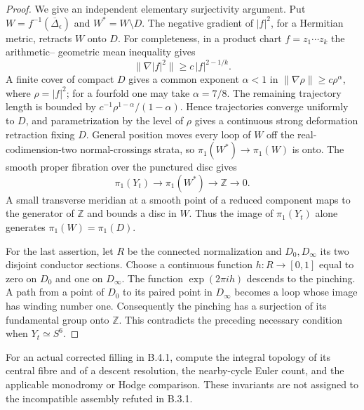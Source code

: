 \begin{proof}
We give an independent elementary
surjectivity argument. Put
$W=f^{-1}(\overline\Delta_\epsilon)$
and $W^*=W\setminus D$. The negative
gradient of $|f|^2$, for a Hermitian
metric, retracts $W$ onto $D$.
For completeness, in a product chart
$f=z_1\cdots z_k$ the arithmetic--
geometric mean inequality gives
\[
 \|\nabla |f|^2\|
   \ge c\,|f|^{2-1/k}.
\]
A finite cover of compact $D$ gives
a common exponent $\alpha<1$ in
$\|\nabla\rho\|\ge c\rho^\alpha$,
where $\rho=|f|^2$; for a fourfold
one may take $\alpha=7/8$.
The remaining trajectory length is
bounded by
$c^{-1}\rho^{1-\alpha}/(1-\alpha)$.
Hence trajectories converge uniformly
to $D$, and parametrization by the
level of $\rho$ gives a continuous
strong deformation retraction fixing
$D$. General position moves every
loop of $W$ off the real-codimension-two
normal-crossings strata, so
$\pi_1(W^*)\to\pi_1(W)$ is onto.
The smooth proper fibration over the
punctured disc gives
\[
 \pi_1(Y_t)\longrightarrow\pi_1(W^*)
       \longrightarrow\mathbb Z\longrightarrow0.
\]
A small transverse meridian at a
smooth point of a reduced component
maps to the generator of $\mathbb Z$
and bounds a disc in $W$.
Thus the image of $\pi_1(Y_t)$ alone
generates $\pi_1(W)=\pi_1(D)$.

For the last assertion, let $R$ be
the connected normalization and
$D_0,D_\infty$ its two disjoint
conductor sections. Choose a
continuous function $h:R\to[0,1]$
equal to zero on $D_0$ and one on
$D_\infty$. The function
$\exp(2\pi i h)$ descends to the
pinching. A path from a point of
$D_0$ to its paired point in
$D_\infty$ becomes a loop whose
image has winding number one.
Consequently the pinching has a
surjection of its fundamental group
onto $\mathbb Z$. This contradicts
the preceding necessary condition
when $Y_t\simeq S^6$.
\end{proof}












\begin{problem}[B.5.1; Open]\label{push:B51}
For an actual corrected filling in B.4.1,
compute the integral topology of its
central fibre and of a descent resolution,
the nearby-cycle Euler count, and the
applicable monodromy or Hodge comparison.
These invariants are not assigned to the
incompatible assembly refuted in B.3.1.
\end{problem}
